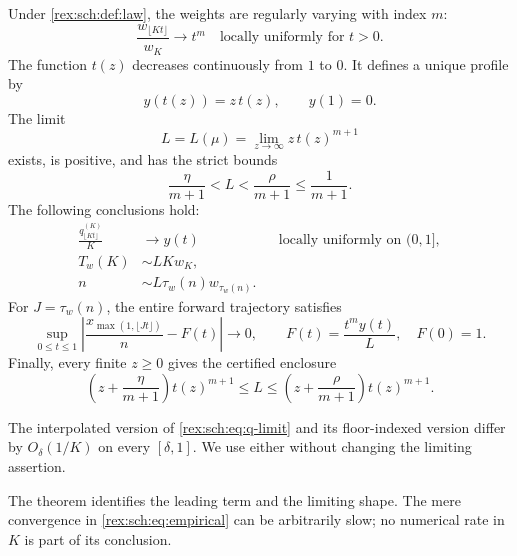 \begin{theorem}\label{rex:sch:thm:main}
Under \cref{rex:sch:def:law}, the weights are regularly varying with index $m$:
\begin{equation}\label{rex:sch:eq:rv-main}
 \frac{w_{\lfloor Kt\rfloor}}{w_K}\longrightarrow t^m
 \quad\text{locally uniformly for }t>0.
\end{equation}
The function $t(z)$ decreases continuously from $1$ to $0$. It defines
a unique profile by
\begin{equation}\label{rex:sch:eq:parametric-profile}
 y(t(z))=z\,t(z),\qquad y(1)=0.
\end{equation}
The limit
\begin{equation}\label{rex:sch:eq:L}
 L=L(\mu)=\lim_{z\to\infty}z\,t(z)^{m+1}
\end{equation}
exists, is positive, and has the strict bounds
\begin{equation}\label{rex:sch:eq:universal-bounds}
 \frac{\eta}{m+1}<L<\frac{\rho}{m+1}\leq\frac{1}{m+1}.
\end{equation}
The following conclusions hold:
\begin{align}
 \frac{q_{\lfloor Kt\rfloor}^{(K)}}{K}&\longrightarrow y(t)
 &&\text{locally uniformly on }(0,1],\label{rex:sch:eq:q-limit}\\
 T_w(K)&\sim L K w_K,\label{rex:sch:eq:T-limit}\\
 n&\sim L\tau_w(n)w_{\tau_w(n)}.
 \label{rex:sch:eq:tau-limit}
\end{align}
For $J=\tau_w(n)$, the entire forward trajectory satisfies
\begin{equation}\label{rex:sch:eq:F-limit}
 \sup_{0\leq t\leq1}
 \left|\frac{x_{\max(1,\lfloor Jt\rfloor)}}{n}-F(t)\right|
 \longrightarrow0,
 \qquad F(t)=\frac{t^m y(t)}{L},\quad F(0)=1.
\end{equation}
Finally, every finite $z\geq0$ gives the certified enclosure
\begin{equation}\label{rex:sch:eq:certificate}
 \left(z+\frac{\eta}{m+1}\right)t(z)^{m+1}
 \leq L\leq
 \left(z+\frac{\rho}{m+1}\right)t(z)^{m+1}.
\end{equation}
\end{theorem}

The interpolated version of \eqref{rex:sch:eq:q-limit} and its floor-indexed
version differ by $O_\delta(1/K)$ on every $[\delta,1]$. We use either
without changing the limiting assertion.

The theorem identifies the leading term and the limiting shape. The
mere convergence in \eqref{rex:sch:eq:empirical} can be arbitrarily slow; no
numerical rate in $K$ is part of its conclusion.

